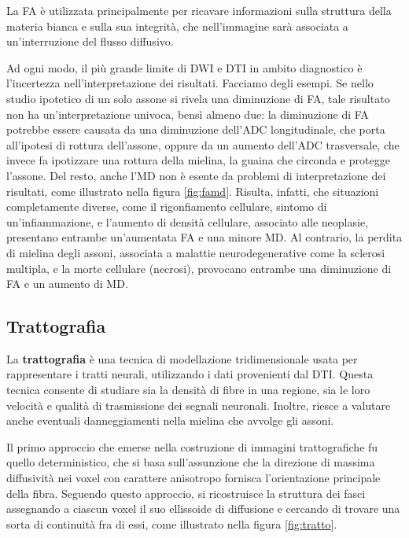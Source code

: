 \documentclass{report}
\newcommand{\figref}[1]{figura \ref{#1}}
\numberwithin{equation}{section}
\numberwithin{figure}{section}
\begin{document}
La FA è utilizzata principalmente per ricavare informazioni sulla struttura della materia bianca e sulla sua integrità, che nell'immagine sarà associata a un'interruzione del flusso diffusivo.

Ad ogni modo, il più grande limite di DWI e DTI in ambito diagnostico è l'incertezza nell'interpretazione dei risultati. Facciamo degli esempi. Se nello studio ipotetico di un solo assone si rivela una diminuzione di FA, tale risultato non ha un'interpretazione univoca, bensì almeno due: la diminuzione di FA potrebbe essere causata da una diminuzione dell'ADC longitudinale, che porta all'ipotesi di rottura dell'assone, oppure da un aumento dell'ADC trasversale, che invece fa ipotizzare una rottura della mielina, la guaina che circonda e protegge l'assone. Del resto, anche l'MD non è esente da problemi di interpretazione dei risultati, come illustrato nella \figref{fig:famd}. Risulta, infatti, che situazioni completamente diverse, come il rigonfiamento cellulare, sintomo di un'infiammazione, e l'aumento di densità cellulare, associato alle neoplasie, presentano entrambe un'aumentata FA e una minore MD. Al contrario, la perdita di mielina degli assoni, associata a malattie neurodegenerative come la sclerosi multipla, e la morte cellulare (necrosi), provocano entrambe una diminuzione di FA e un aumento di MD.

\subsection{Trattografia}
La \textbf{trattografia} è una tecnica di modellazione tridimensionale usata per rappresentare i tratti neurali, utilizzando i dati provenienti dal DTI. Questa tecnica consente di studiare sia la densità di fibre in una regione, sia le loro velocità e qualità di trasmissione dei segnali neuronali. Inoltre, riesce a valutare anche eventuali danneggiamenti nella mielina che avvolge gli assoni.

Il primo approccio che emerse nella costruzione di immagini trattografiche fu quello deterministico, che si basa sull'assunzione che la direzione di massima diffusività nei voxel con carattere anisotropo fornisca l'orientazione principale della fibra. Seguendo questo approccio, si ricostruisce la struttura dei fasci assegnando a ciascun voxel il suo ellissoide di diffusione e cercando di trovare una sorta di continuità fra di essi, come illustrato nella \figref{fig:tratto}.
\end{document}
